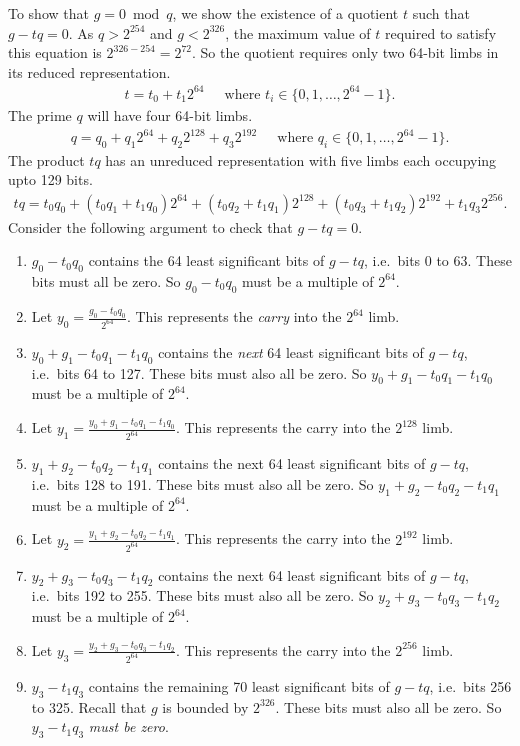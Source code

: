 \documentclass[a4paper, 12pt]{article}
\begin{document}
To show that $g = 0 \bmod q$, we show the existence of a quotient $t$ such that $g-tq = 0$. As $q > 2^{254}$ and $g < 2^{326}$, the maximum value of $t$ required to satisfy this equation is $2^{326-254} = 2^{72}$. So the quotient requires only two 64-bit limbs in its reduced representation.
\begin{align*}
  t = t_0 + t_1 2^{64}\ \ \ \ \ \text{ where } t_i \in \{0,1,\ldots,2^{64}-1\}.
\end{align*}
The prime $q$ will have four 64-bit limbs.
\begin{align*}
  q = q_0 + q_1 2^{64} + q_2 2^{128} + q_3 2^{192} \ \ \ \ \ \text{ where } q_i \in \{0,1,\ldots,2^{64}-1\}.
\end{align*}
The product $tq$ has an unreduced representation with five limbs each occupying upto 129 bits.
\begin{align*}
  tq  = t_0q_0 + (t_0q_1 + t_1q_0) 2^{64} + (t_0q_2 + t_1q_1) 2^{128} + (t_0q_3 + t_1q_2) 2^{192} + t_1q_3 2^{256}.
\end{align*}
Consider the following argument to check that $g-tq = 0$.
\begin{enumerate}
  \item $g_0-t_0q_0$ contains the 64 least significant bits of $g-tq$, i.e.~bits 0 to 63. These bits must all be zero. So $g_0-t_0q_0$ must be a multiple of $2^{64}$. 
  \item Let $y_0 = \frac{g_0-t_0q_0}{2^{64}}$. This represents the \textit{carry} into the $2^{64}$ limb.
  \item $y_0+g_1-t_0q_1-t_1q_0$ contains the \textit{next} 64 least significant bits of $g-tq$, i.e.~bits 64 to 127. These bits must also all be zero. So $y_0+g_1-t_0q_1-t_1q_0$ must be a multiple of $2^{64}$.
  \item Let $y_1 = \frac{y_0+g_1-t_0q_1-t_1q_0}{2^{64}}$. This represents the carry into the $2^{128}$ limb.
  \item $y_1+g_2-t_0q_2-t_1q_1$ contains the next 64 least significant bits of $g-tq$, i.e.~bits 128 to 191. These bits must also all be zero. So $y_1+g_2-t_0q_2-t_1q_1$ must be a multiple of $2^{64}$.
  \item Let $y_2 = \frac{y_1+g_2-t_0q_2-t_1q_1}{2^{64}}$. This represents the carry into the $2^{192}$ limb.
  \item $y_2+g_3-t_0q_3-t_1q_2$ contains the next 64 least significant bits of $g-tq$, i.e.~bits 192 to 255. These bits must also all be zero. So $y_2+g_3-t_0q_3-t_1q_2$ must be a multiple of $2^{64}$.
  \item Let $y_3 = \frac{y_2+g_3-t_0q_3-t_1q_2}{2^{64}}$. This represents the carry into the $2^{256}$ limb.
  \item $y_3-t_1q_3$ contains the remaining 70 least significant bits of $g-tq$, i.e.~bits 256 to 325. Recall that $g$ is bounded by $2^{326}$. These bits must also all be zero. So $y_3-t_1q_3$ \textit{must be zero}.
\end{enumerate}
\end{document}
